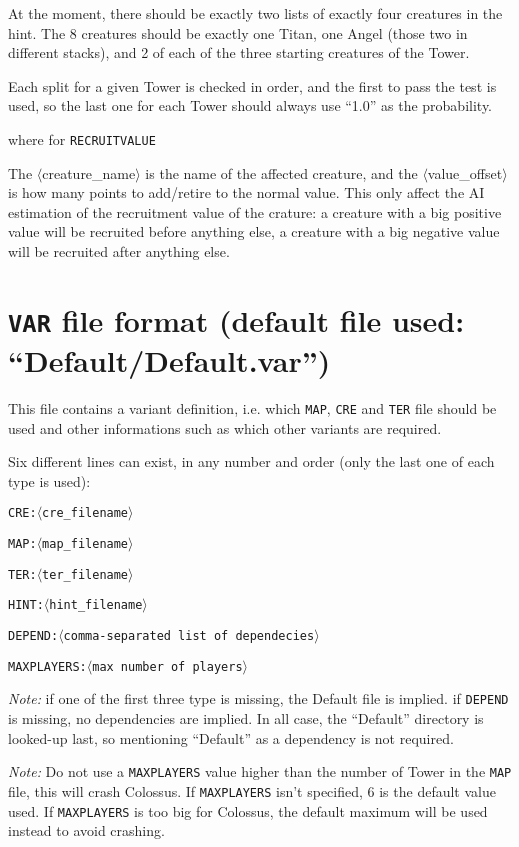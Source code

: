 \documentclass{article}
\begin{document}
At the moment, there should be exactly two lists of exactly four creatures in the hint. The 8 creatures should be exactly one Titan, one Angel (those two in different stacks), and 2 of each of the three starting creatures of the Tower.

Each split for a given Tower is checked in order, and the first to pass the test is used, so the last one for each Tower should always use ``1.0'' as the probability.

where for \texttt{RECRUITVALUE}

The $\langle$creature\_name$\rangle$ is the name of the affected creature, and the $\langle$value\_offset$\rangle$ is how many points to add/retire to the normal value. This only affect the AI estimation of the recruitment value of the crature: a creature with a big positive value will be recruited before anything else, a creature with a big negative value will be recruited after anything else.

\section{\texttt{VAR} file format (default file used: ``Default/Default.var'')}
\label{VAR}

This file contains a variant definition, i.e. which
\texttt{MAP}, \texttt{CRE} and \texttt{TER} file should be used and other informations such as which other variants are required.

Six different lines can exist, in any number and order (only the last one of each type is used):

\texttt{\texttt{CRE}:$\langle$cre\_filename$\rangle$}

\texttt{\texttt{MAP}:$\langle$map\_filename$\rangle$}

\texttt{\texttt{TER}:$\langle$ter\_filename$\rangle$}

\texttt{\texttt{HINT}:$\langle$hint\_filename$\rangle$}

\texttt{\texttt{DEPEND}:$\langle$comma-separated list of dependecies$\rangle$}

\texttt{\texttt{MAXPLAYERS}:$\langle$max number of players$\rangle$}

\textit{Note:} if one of the  first three type is missing, the Default file is implied. if \texttt{DEPEND} is missing, no dependencies are implied. In all case, the ``Default'' directory is looked-up last, so mentioning ``Default'' as a dependency is not required.

\textit{Note:} Do not use a \texttt{MAXPLAYERS} value higher than the number of Tower in the \texttt{MAP} file, this will crash Colossus. If \texttt{MAXPLAYERS} isn't specified, 6 is the default value used. If \texttt{MAXPLAYERS} is too big for Colossus, the default maximum will be used instead to avoid crashing.
\end{document}
